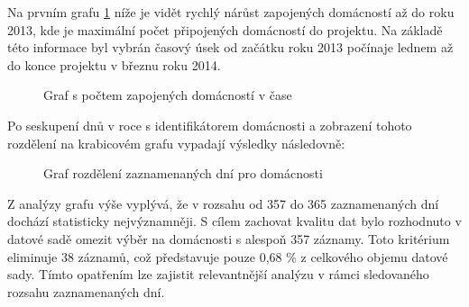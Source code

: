\documentclass[FM,BP,fonts]{tulthesis}
\begin{document}
Na prvním grafu \ref{fig:domacnosti-v-case} níže je vidět rychlý nárůst zapojených domácností až do roku 2013, kde je maximální počet připojených domácností do projektu. Na základě této informace byl vybrán časový úsek od začátku roku 2013 počínaje lednem až do konce projektu v březnu roku 2014.


\begin{figure}[htbp]
	\centering
	\caption{Graf s počtem zapojených domácností v čase }
	\label{fig:domacnosti-v-case}
\end{figure}

Po seskupení dnů v roce s identifikátorem domácnosti a zobrazení tohoto rozdělení na krabicovém grafu vypadají výsledky následovně:

\begin{figure}[htbp]
	\centering
	\caption{Graf rozdělení zaznamenaných dní pro domácnosti }
	\label{fig:domacnosti-v-case-pocet-dni}
\end{figure}


Z analýzy grafu výše vyplývá, že v rozsahu od 357 do 365 zaznamenaných dní dochází statisticky nejvýznamněji. S cílem zachovat kvalitu dat bylo rozhodnuto v datové sadě omezit výběr na domácnosti s alespoň 357 záznamy. Toto kritérium eliminuje 38 záznamů, což představuje pouze 0,68 \% z celkového objemu datové sady. Tímto opatřením lze zajistit relevantnější analýzu v rámci sledovaného rozsahu zaznamenaných dní.
\end{document}
